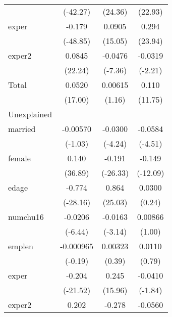 \begin{table}[htbp]
\begin{tabular}{l*{3}{c}}
            &    (-42.27)         &     (24.36)         &     (22.93)         \\
[1em]
exper       &      -0.179\sym{***}&      0.0905\sym{***}&       0.294\sym{***}\\
            &    (-48.85)         &     (15.05)         &     (23.94)         \\
[1em]
exper2      &      0.0845\sym{***}&     -0.0476\sym{***}&     -0.0319\sym{*}  \\
            &     (22.24)         &     (-7.36)         &     (-2.21)         \\
[1em]
Total       &      0.0520\sym{***}&     0.00615         &       0.110\sym{***}\\
            &     (17.00)         &      (1.16)         &     (11.75)         \\
\hline
Unexplained &                     &                     &                     \\
married     &    -0.00570         &     -0.0300\sym{***}&     -0.0584\sym{***}\\
            &     (-1.03)         &     (-4.24)         &     (-4.51)         \\
[1em]
female      &       0.140\sym{***}&      -0.191\sym{***}&      -0.149\sym{***}\\
            &     (36.89)         &    (-26.33)         &    (-12.09)         \\
[1em]
edage       &      -0.774\sym{***}&       0.864\sym{***}&      0.0300         \\
            &    (-28.16)         &     (25.03)         &      (0.24)         \\
[1em]
numchu16    &     -0.0206\sym{***}&     -0.0163\sym{**} &     0.00866         \\
            &     (-6.44)         &     (-3.14)         &      (1.00)         \\
[1em]
emplen      &   -0.000965         &     0.00323         &      0.0110         \\
            &     (-0.19)         &      (0.39)         &      (0.79)         \\
[1em]
exper       &      -0.204\sym{***}&       0.245\sym{***}&     -0.0410         \\
            &    (-21.52)         &     (15.96)         &     (-1.84)         \\
[1em]
exper2      &       0.202\sym{***}&      -0.278\sym{***}&     -0.0560         \\

\end{tabular}
\end{table}
